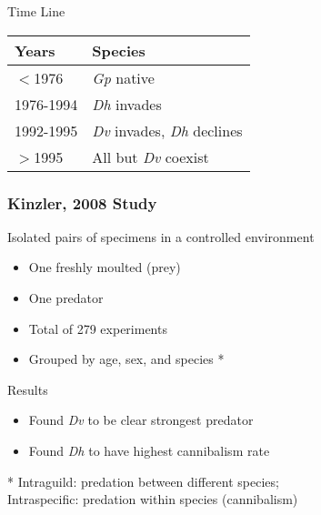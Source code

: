 \begin{frame}{Time Line}

  \vfill

  \begin{tabular}{l|l}
    Years      & Species \\ \hline
    $<$1976    & \textit{Gp} native\\
    1976-1994  & \textit{Dh} invades\\
    1992-1995  & \textit{Dv} invades, \textit{Dh} declines\\
    $>$1995    & All but \textit{Dv} coexist 
  \end{tabular}

  \vfill

\end{frame}


\begin{frame}
   \frametitle{Kinzler, 2008 Study}
	\vfill
	
	Isolated pairs of specimens in a controlled environment
	\begin{itemize}
		\item One freshly moulted (prey) 
		\item One predator
		\item Total of 279 experiments
		\item Grouped by age, sex, and species \**
	\end{itemize}
	
\vfill
	Results\\
\begin{itemize}
	\item Found \textit{Dv} to be clear strongest predator\\
\vspace{.5em}
	\item Found \textit{Dh} to have highest cannibalism rate
\end{itemize}

\vfill

\** Intraguild: predation between different species;\\ 
\hspace{.5em} Intraspecific: predation within species (cannibalism) \cite{doi:10.1146/annurev.es.20.110189.001501}

\end{frame}


